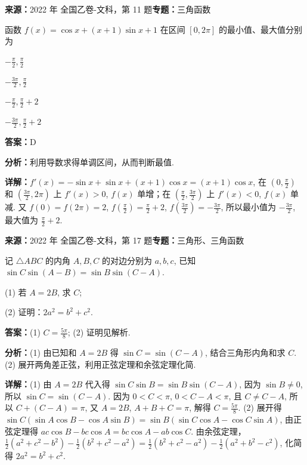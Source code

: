\begin{question}[points=5]
\textbf{来源：}2022 年 全国乙卷-文科，第 11 题\quad \textbf{专题：}三角函数\par
函数 $f(x) = \cos x + (x+1)\sin x + 1$ 在区间 $[0, 2\pi]$ 的最小值、最大值分别为
\begin{choices}
  \item $-\frac{\pi}{2}, \frac{\pi}{2}$
  \item $-\frac{3\pi}{2}, \frac{\pi}{2}$
  \item $-\frac{\pi}{2}, \frac{\pi}{2}+2$
  \item $-\frac{3\pi}{2}, \frac{\pi}{2}+2$
\end{choices}
\begin{solution}
\textbf{答案：}D

\textbf{分析：}利用导数求得单调区间，从而判断最值.

\textbf{详解：}$f'(x) = -\sin x + \sin x + (x+1)\cos x = (x+1)\cos x$, 在 $(0,\frac{\pi}{2})$ 和 $(\frac{3\pi}{2},2\pi)$ 上 $f'(x)>0$, $f(x)$ 单增；在 $(\frac{\pi}{2},\frac{3\pi}{2})$ 上 $f'(x)<0$, $f(x)$ 单减. 又 $f(0)=f(2\pi)=2$, $f(\frac{\pi}{2})=\frac{\pi}{2}+2$, $f(\frac{3\pi}{2}) = -\frac{3\pi}{2}$, 所以最小值为 $-\frac{3\pi}{2}$, 最大值为 $\frac{\pi}{2}+2$.
\end{solution}
\end{question}

\begin{question}[points=12]
\textbf{来源：}2022 年 全国乙卷-文科，第 17 题\quad \textbf{专题：}三角形、三角函数\par
记 $\triangle ABC$ 的内角 $A,B,C$ 的对边分别为 $a,b,c$, 已知 $\sin C \sin(A-B) = \sin B \sin(C-A)$.

(1) 若 $A=2B$, 求 $C$;

(2) 证明：$2a^2 = b^2 + c^2$.
\begin{solution}
\textbf{答案：}(1) $C = \frac{5\pi}{8}$; (2) 证明见解析.

\textbf{分析：}(1) 由已知和 $A=2B$ 得 $\sin C = \sin(C-A)$, 结合三角形内角和求 $C$.
(2) 展开两角差正弦，利用正弦定理和余弦定理化简.

\textbf{详解：}(1) 由 $A=2B$ 代入得 $\sin C\sin B = \sin B\sin(C-A)$, 因为 $\sin B\neq0$, 所以 $\sin C = \sin(C-A)$. 因为 $0<C<\pi$, $0<C-A<\pi$, 且 $C\neq C-A$, 所以 $C+(C-A)=\pi$, 又 $A=2B$, $A+B+C=\pi$, 解得 $C=\frac{5\pi}{8}$.
(2) 展开得 $\sin C(\sin A\cos B-\cos A\sin B) = \sin B(\sin C\cos A-\cos C\sin A)$, 由正弦定理得 $ac\cos B - bc\cos A = bc\cos A - ab\cos C$. 由余弦定理，$\frac12(a^2+c^2-b^2)-\frac12(b^2+c^2-a^2) = \frac12(b^2+c^2-a^2)-\frac12(a^2+b^2-c^2)$, 化简得 $2a^2=b^2+c^2$.
\end{solution}
\end{question}

